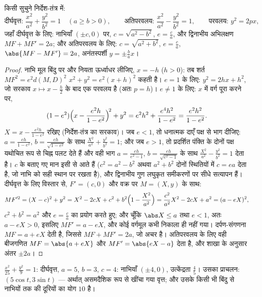 \begin{theorem}[लघुकृत समीकरण]\label{thm:b1:curves:reduced}
किसी सुचुने  निर्देश-तंत्र में:
\[
\text{दीर्घवृत्त: } \frac{x^2}{a^2} + \frac{y^2}{b^2} = 1
\quad (a \geq b > 0),
\qquad
\text{अतिपरवलय: } \frac{x^2}{a^2} - \frac{y^2}{b^2} = 1,
\qquad
\text{परवलय: } y^2 = 2px,
\]
जहाँ दीर्घवृत्त के लिए: नाभियाँ $(\pm c, 0)$ पर, $c = \sqrt{a^2 - b^2}$, $e
= \frac ca$, और द्विनाभीय अभिलक्षण $MF + MF' = 2a$; और अतिपरवलय के लिए: $c =
\sqrt{a^2 + b^2}$, $e = \frac ca$, $\abs{MF - MF'} = 2a$, अनंतस्पर्शी $y =
\pm\frac ba x$।
\end{theorem}

\begin{proof}
नाभि मूल बिंदु पर और नियता ऊर्ध्वाधर लीजिए, $x = -h$ ($h > 0$): तब शर्त
$MF^2 = e^2 d(M, D)^2$ $x^2 + y^2 = e^2 (x + h)^2$ कहती है। $e = 1$ के लिए:
$y^2 = 2hx + h^2$, जो सरकाव $x \mapsto x - \frac h2$ के बाद एक परवलय है (अतः
$p = h$)। $e \neq 1$ के लिए: $x$ में वर्ग पूरा करने पर,
\[
(1 - e^2)\Bigl(x - \frac{e^2 h}{1 - e^2}\Bigr)^{\!2} + y^2
= e^2h^2 + \frac{e^4 h^2}{1 - e^2}
= \frac{e^2 h^2}{1 - e^2} .
\]
$X = x - \frac{e^2h}{1-e^2}$ रखिए (निर्देश-तंत्र का सरकाव)। जब $e < 1$, तो
धनात्मक दाएँ पक्ष से भाग दीजिए: $a = \frac{eh}{1 - e^2}$, $b =
\frac{eh}{\sqrt{1-e^2}}$ के साथ $\frac{X^2}{a^2} + \frac{y^2}{b^2} = 1$; और
जब $e > 1$, तो प्रदर्शित पंक्ति के दोनों पक्ष यथोचित रूप से चिह्न पलट देते
हैं और वही भाग $a = \frac{eh}{e^2 - 1}$, $b = \frac{eh}{\sqrt{e^2 - 1}}$ के
साथ $\frac{X^2}{a^2} - \frac{y^2}{b^2} = 1$ देता है। $c$ के बताए गए मान इसी
से आते हैं ($c^2 = a^2 - b^2$ अथवा $a^2 + b^2$ दोनों स्थितियों में $c = ea$
देता है, जो नाभि को सही स्थान पर रखता है), और द्विनाभीय गुण लघुकृत समीकरणों
पर सीधे सत्यापन हैं। दीर्घवृत्त के लिए विस्तार से, $F' = (c, 0)$ और वक्र पर
$M = (X, y)$ के साथ:
\[
MF'^2 = (X - c)^2 + y^2
= X^2 - 2cX + c^2 + b^2\Bigl(1 - \frac{X^2}{a^2}\Bigr)
= \frac{c^2}{a^2}X^2 - 2cX + a^2
= (a - eX)^2 ,
\]
$c^2 + b^2 = a^2$ और $e = \frac ca$ का प्रयोग करते हुए; और चूँकि $\abs X
\leq a$ तथा $e < 1$, अतः $a - eX > 0$, इसलिए $MF' = a - eX$, और कोई वर्गमूल
कभी निकाला ही नहीं गया। दर्पण-संगणना $MF = a + eX$ देती है, जिससे $MF + MF'
= 2a$, जो अचर है। अतिपरवलय के लिए वही बीजगणित $MF = \abs{a + eX}$ और $MF' =
\abs{eX - a}$ देता है, और शाखा के अनुसार अंतर $\pm2a$।
\end{proof}

\begin{example}\label{ex:b1:curves:conicexample}
$\frac{x^2}{25} + \frac{y^2}{9} = 1$: दीर्घवृत्त, $a = 5$, $b = 3$, $c = 4$:
नाभियाँ $(\pm4, 0)$, उत्केंद्रता $\frac45$। उसका प्राचलन: $(5\cos t, 3\sin
t)$ --- अर्थात् असमदैशिक रूप से खींचा गया वृत्त; और उसके किसी भी बिंदु से
नाभियों तक की दूरियों का योग $10$ है।
\end{example}


